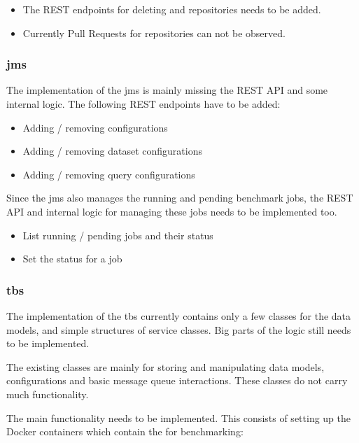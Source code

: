 \begin{itemize}
	\item The REST endpoints for deleting \gh{} and \dockh{} repositories needs to be added.
	
	\item Currently Pull Requests for \gh{} repositories can not be observed.
\end{itemize}


\subsubsection{\acl{jms}}
The implementation of the \acl{jms} is mainly missing the REST API and some internal logic.
The following REST endpoints have to be added:

\begin{itemize}
	\item Adding / removing \ts{} configurations
	
	\item Adding / removing dataset configurations
	
	\item Adding / removing query configurations
\end{itemize}

Since the \ac{jms} also manages the running and pending benchmark jobs, the REST API and internal logic for managing these jobs needs to be implemented too.

\begin{itemize}
	\item List running / pending jobs and their status
	
	\item Set the status for a job
\end{itemize}



\subsubsection{\acl{tbs}}
The implementation of the \acl{tbs} currently contains only a few classes for the data models, and simple structures of service classes.
Big parts of the logic still needs to be implemented.

The existing classes are mainly for storing and manipulating data models, configurations and basic message queue interactions.
These classes do not carry much functionality.

The main functionality needs to be implemented.
This consists of setting up the Docker containers which contain the \tsp{} for benchmarking:

